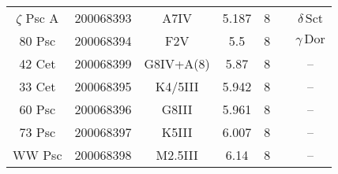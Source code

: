 \begin{table*}
\begin{tabular}{ccccccc}
$\zeta$ Psc A & 200068393 & A7IV & 5.187 & 8 &  & $\delta\,\text{Sct}$ \\
80 Psc & 200068394 & F2V & 5.5 & 8 &  & $\gamma\,\text{Dor}$ \\
42 Cet & 200068399 & G8IV+A(8) & 5.87 & 8 &  & -- \\
33 Cet & 200068395 & K4/5III & 5.942 & 8 &  & -- \\
60 Psc & 200068396 & G8III & 5.961 & 8 &  & -- \\
73 Psc & 200068397 & K5III & 6.007 & 8 &  & -- \\
WW Psc & 200068398 & M2.5III & 6.14 & 8 &  & -- \\
\hline
\end{tabular}
\end{table*}
